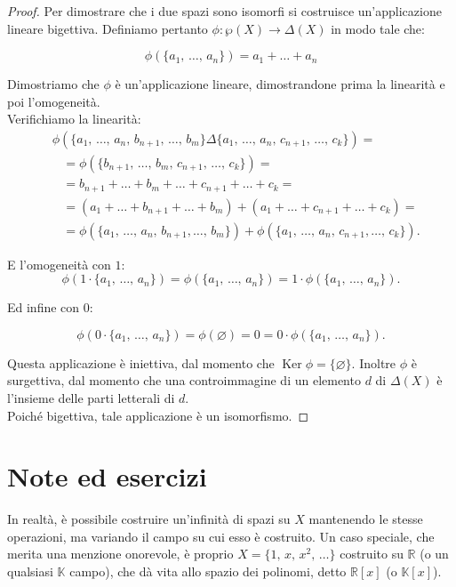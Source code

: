 \documentclass[a4paper]{article}
\begin{document}
\begin{proof}
Per dimostrare che i due spazi sono isomorfi si costruisce un'applicazione lineare
bigettiva. Definiamo pertanto $\phi : \wp(X) \to \Delta (X)$ in modo tale che:

\[\phi(\{a_1, \, \ldots, \, a_n\}) = a_1 + \ldots + a_n\]

Dimostriamo che $\phi$ è un'applicazione lineare, dimostrandone prima la linearità e poi
l'omogeneità. \\

Verifichiamo la linearità:
\[\begin{split}
&\phi (\{a_1, \, \ldots, \, a_n, \, b_{n+1}, \, \ldots, \, b_m \} \Delta \{a_1, \, \ldots, \, a_n, \, c_{n+1}, \, \ldots, \, c_k \}) = \\
&\;\;\;= \phi (\{ b_{n+1}, \, \ldots, \, b_m, \, c_{n+1}, \, \ldots, \, c_k \}) = \\
&\;\;\;= b_{n+1} + \ldots + b_m + \ldots + c_{n+1} + \ldots + c_k = \\
&\;\;\;= (a_1 + \ldots + b_{n+1} + \ldots + b_m) + (a_1 + \ldots + c_{n+1} + \ldots + c_k) = \\
&\;\;\;= \phi (\{a_1, \, \ldots, \, a_n, \, b_{n+1}, \ldots, \, b_m \}) + \phi (\{a_1, \, \ldots, \, a_n, \, c_{n+1}, \ldots, \, c_k \}).
\end{split}\]

E l'omogeneità con $1$:
\[\phi (1 \cdot \{a_1, \, \ldots, \, a_n \}) = \phi (\{a_1, \, \ldots, \, a_n \}) =  1 \cdot \phi (\{a_1, \, \ldots, \, a_n \}).\]

Ed infine con $0$:

\[\phi (0 \cdot \{a_1, \, \ldots, \, a_n \}) = \phi (\varnothing) = 0 = 0 \cdot \phi (\{a_1, \, \ldots, \, a_n \}).\]

Questa applicazione è iniettiva, dal momento che $\operatorname{Ker}\phi = \{\varnothing\}$.
Inoltre $\phi$ è surgettiva, dal momento che una controimmagine di un elemento $d$ di $\Delta (X)$ è l'insieme delle parti letterali di $d$. \\

Poiché bigettiva, tale applicazione è un isomorfismo.

\end{proof}

\section{Note ed esercizi}

In realtà, è possibile costruire un'infinità di spazi su $X$ mantenendo le stesse operazioni, ma variando il campo su cui esso
è costruito. Un caso speciale, che merita una
menzione onorevole, è proprio $X = \{1, \, x, \, x^2, \, \ldots\}$ costruito su $\mathbb{R}$ (o un qualsiasi
$\mathbb{K}$ campo), che dà vita allo spazio dei polinomi, detto $\mathbb{R}[x]$ (o
$\mathbb{K}[x]$).
\end{document}
